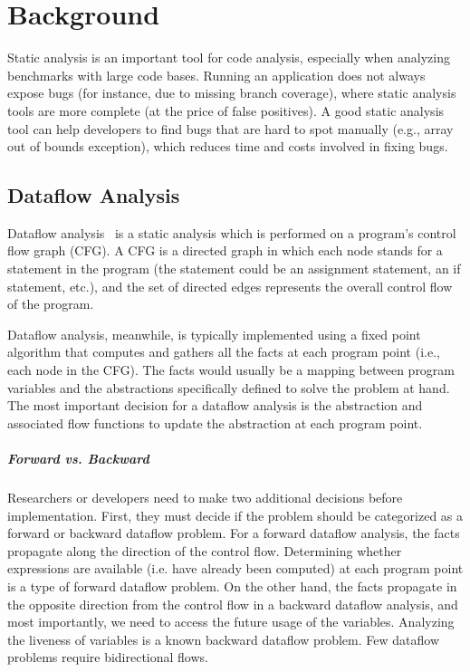 \chapter{Background}
\label{chap:background}

Static analysis is an important tool for code analysis, especially when analyzing benchmarks with large code bases. Running an application does not always expose bugs (for instance, due to missing branch coverage), where static analysis tools are more complete (at the price of false positives). A good static analysis tool can help developers to find bugs that are hard to spot manually (e.g., array out of bounds exception), which reduces time and costs involved in fixing bugs. 

\section{Dataflow Analysis}

Dataflow analysis~\cite{kildall73:_unified_approac_global_progr_optim} is a static analysis which is performed on a program's control flow graph (CFG). A CFG is a directed graph in which each node stands for a statement in the program (the statement could be an assignment statement, an if statement, etc.), and the set of directed edges represents the overall control flow of the program.

Dataflow analysis, meanwhile, is typically implemented using a fixed point algorithm that computes and gathers all the facts at each program point (i.e., each node in the CFG). The facts would usually be a mapping between program variables and the abstractions specifically defined to solve the problem at hand. The most important decision for a dataflow analysis is the abstraction and associated flow functions to update the abstraction at each program point.

\paragraph{Forward vs. Backward} Researchers or developers need to make two additional decisions before implementation. First, they must decide if the problem should be categorized as a forward or backward dataflow problem. For a forward dataflow analysis, the facts propagate along the direction of the control flow. Determining whether expressions are available (i.e. have already been computed) at each program point is a type of forward dataflow problem. On the other hand, the facts propagate in the opposite direction from the control flow in a backward dataflow analysis, and most importantly, we need to access the future usage of the variables. Analyzing the liveness of variables is a known backward dataflow problem. Few dataflow problems require bidirectional flows.

